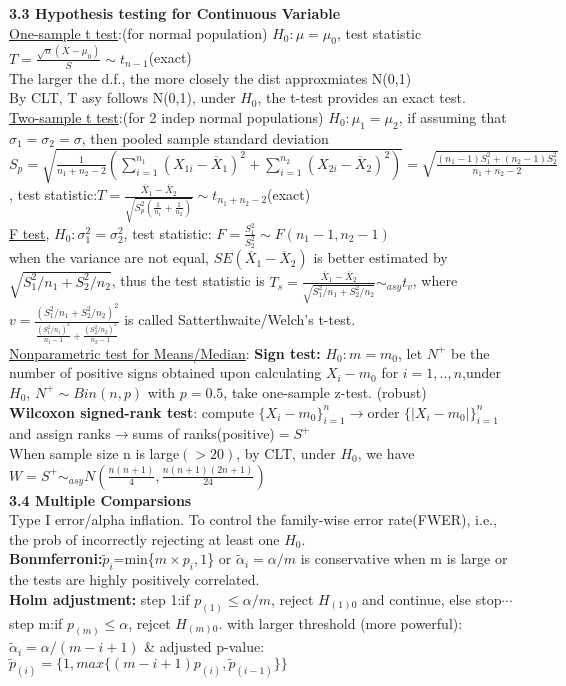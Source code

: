 \documentclass[10pt,a4paper,landscape]{article}
\begin{document}
\begin{multicols}{3}
{\textbf{3.3 Hypothesis testing for Continuous Variable}\\
\underline{One-sample t test}:(for normal population) $H_0: \mu=\mu_0$, test statistic $T=\frac{\sqrt{n}(\overline{X}-\mu_0)}{S}\sim t_{n-1}$(exact)\\
The larger the d.f., the more closely the dist approxmiates N(0,1)\\
By CLT, T asy follows N(0,1), under $H_0$, the t-test provides an exact test.\\
\underline{Two-sample t test}:(for 2 indep normal populations) $H_0:\mu_1=\mu_2$, if assuming that $\sigma_1=\sigma_2=\sigma$, then pooled sample standard deviation $S_p=\sqrt{\frac{1}{n_1+n_2-2}(\sum_{i=1}^{n_1}(X_{1i}-\overline{X}_1)^2+\sum_{i=1}^{n_2}(X_{2i}-\overline{X}_2)^2 )  }=\sqrt{\frac{(n_1-1)S_1^2+(n_2-1)S_2^2}{n_1+n_2-2} }$,
test statistic:$T=\frac{\overline{X}_1-\overline{X}_2}{\sqrt{S_p^2(\frac{1}{n_1}+\frac{1}{n_2} )}}\sim t_{n_1+n_2-2}$(exact)\\
\underline{F test}, $H_0: \sigma_1^2=\sigma_2^2$, test statistic: $F=\frac{S_1^2}{S_2^2}\sim F(n_1-1,n_2-1)$\\
when the variance are not equal, $SE(\overline{X}_1-\overline{X}_2)$ is better estimated by $\sqrt{S_1^2/n_1+S_2^2/n_2}$, thus the test statistic is
$T_s=\frac{\overline{X}_1-\overline{X}_2}{\sqrt{S_1^2/n_1+S_2^2/n_2}}\sim_{asy} t_{v} $, where $v=\frac{(S_1^2/n_1+S_2^2/n_2)^2}{ \frac{(S_1^2/n_1)^2 }{n_1-1} +\frac{(S_2^2/n_2)^2 }{n_2-1} } $ is called Satterthwaite/Welch's t-test.\\
\underline{Nonparametric test for Means/Median}: \textbf{Sign test:} $H_0:m=m_0$, let $N^+$ be the number of positive signs obtained upon calculating $X_i-m_0$ for $i=1,..,n$,under $H_0$, $N^+\sim Bin(n,p)$ with $p=0.5$, take one-sample z-test. (robust)\\
\textbf{Wilcoxon signed-rank test}: compute $\{X_i-m_0 \}_{i=1}^n$$\rightarrow$order $\{|X_i-m_0|\}_{i=1}^n$ and assign ranks$\rightarrow$sums of ranks(positive)$=S^+$\\
When sample size n is large$(>20)$, by CLT, under $H_0$, we have $W=S^+\sim_{asy} N(\frac{n(n+1)}{4},\frac{n(n+1)(2n+1)}{24})$\\
\textbf{3.4 Multiple Comparsions}\\
Type I error/alpha inflation. To control the family-wise error rate(FWER), i.e., the prob of incorrectly rejecting at least one $H_0$.\\
\textbf{Bonmferroni:}$\tilde{p}_i$=min\{$m\times p_i,1$\} or $\tilde{\alpha}_i=\alpha/m$ is conservative when m is large or the tests are highly positively correlated.\\
\textbf{Holm adjustment:} step 1:if $p_{(1)}\leq \alpha/m$, reject $H_{(1)0}$ and continue, else stop$\cdots$ step m:if $p_{(m)}\leq \alpha$, rejcet $H_{(m)0}$. with larger threshold (more powerful):$\tilde{\alpha}_i=\alpha/(m-i+1)$ \& adjusted p-value: $\tilde{p}_{(i)}= \{1, max\{ (m-i+1)p_{(i)},\tilde{p}_{(i-1)}  \}\}$








}
\end{multicols}
\end{document}
